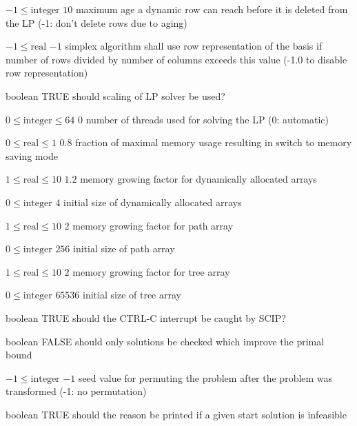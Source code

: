 %
{$-1\leq\textrm{integer}$}%
{$10$}%
{maximum age a dynamic row can reach before it is deleted from the LP (-1: don't delete rows due to aging)}%
{}

%
{$-1\leq\textrm{real}$}%
{$-1$}%
{simplex algorithm shall use row representation of the basis if number of rows divided by number of columns exceeds this value (-1.0 to disable row representation)}%
{}

%
{boolean}%
{TRUE}%
{should scaling of LP solver be used?}%
{}

%
{$0\leq\textrm{integer}\leq64$}%
{$0$}%
{number of threads used for solving the LP (0: automatic)}%
{}

%
{$0\leq\textrm{real}\leq1$}%
{$0.8$}%
{fraction of maximal memory usage resulting in switch to memory saving mode}%
{}

%
{$1\leq\textrm{real}\leq10$}%
{$1.2$}%
{memory growing factor for dynamically allocated arrays}%
{}

%
{$0\leq\textrm{integer}$}%
{$4$}%
{initial size of dynamically allocated arrays}%
{}

%
{$1\leq\textrm{real}\leq10$}%
{$2$}%
{memory growing factor for path array}%
{}

%
{$0\leq\textrm{integer}$}%
{$256$}%
{initial size of path array}%
{}

%
{$1\leq\textrm{real}\leq10$}%
{$2$}%
{memory growing factor for tree array}%
{}

%
{$0\leq\textrm{integer}$}%
{$65536$}%
{initial size of tree array}%
{}

%
{boolean}%
{TRUE}%
{should the CTRL-C interrupt be caught by SCIP?}%
{}

%
{boolean}%
{FALSE}%
{should only solutions be checked which improve the primal bound}%
{}

%
{$-1\leq\textrm{integer}$}%
{$-1$}%
{seed value for permuting the problem after the problem was transformed (-1: no permutation)}%
{}

%
{boolean}%
{TRUE}%
{should the reason be printed if a given start solution is infeasible}%
{}

